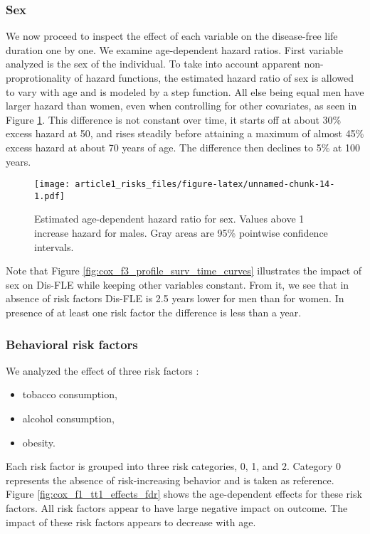 \documentclass[risks,article,submit,moreauthors,pdftex]{Definitions/mdpi}
\providecommand{\tightlist}{%
  \setlength{\itemsep}{0pt}\setlength{\parskip}{0pt}}
\begin{document}
\hypertarget{sex}{%
\subsubsection{Sex}\label{sex}}

We now proceed to inspect the effect of each variable on the
disease-free life duration one by one. We examine age-dependent hazard
ratios. First variable analyzed is the sex of the individual. To take
into account apparent non-proprotionality of hazard functions, the
estimated hazard ratio of sex is allowed to vary with age and is modeled
by a step function. All else being equal men have larger hazard than
women, even when controlling for other covariates, as seen in Figure
\ref{fig:cox_f1_tt1_effects_sex}. This difference is not constant over
time, it starts off at about 30\% excess hazard at 50, and rises
steadily before attaining a maximum of almost 45\% excess hazard at
about 70 years of age. The difference then declines to 5\% at 100 years.

\begin{figure}
\centering
\texttt{[image: article1\_risks\_files/figure-latex/unnamed-chunk-14-1.pdf]}
\caption{\label{fig:cox_f1_tt1_effects_sex} Estimated age-dependent
hazard ratio for sex. Values above 1 increase hazard for males. Gray
areas are 95\% pointwise confidence intervals.}
\end{figure}

Note that Figure \ref{fig:cox_f3_profile_surv_time_curves} illustrates
the impact of sex on Dis-FLE while keeping other variables constant.
From it, we see that in absence of risk factors Dis-FLE is 2.5 years
lower for men than for women. In presence of at least one risk factor
the difference is less than a year.

\hypertarget{behavioral-risk-factors}{%
\subsubsection{Behavioral risk factors}\label{behavioral-risk-factors}}

We analyzed the effect of three risk factors :

\begin{itemize}
\tightlist
\item
  tobacco consumption,
\item
  alcohol consumption,
\item
  obesity.
\end{itemize}

Each risk factor is grouped into three risk categories, 0, 1, and 2.
Category 0 represents the absence of risk-increasing behavior and is
taken as reference. Figure \ref{fig:cox_f1_tt1_effects_fdr} shows the
age-dependent effects for these risk factors. All risk factors appear to
have large negative impact on outcome. The impact of these risk factors
appears to decrease with age.
\end{document}
